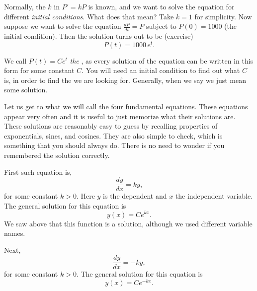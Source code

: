 \documentclass[12pt]{book}
\begin{document}
Normally, the $k$ in $P' = kP$ is known,
and we want to solve
the equation for different \emph{initial conditions}.
What does that mean?
Take $k=1$ for simplicity.  Now suppose we want to solve the equation
$\frac{dP}{dt} = P$ 
subject to $P(0) = 1000$ (the initial condition).
Then the solution turns out to be (exercise)
\begin{equation*}
P(t) = 1000 \, e^t .
\end{equation*}

We call $P(t) = C e^t$ \emph{the },
as every solution
of the equation can be written in this form for some constant $C$.  You
will need an initial condition to find out what $C$ is, in order to find the
\emph{} we are looking for.  Generally, when we say
 we just mean some solution.

\medskip

Let us get to what we will call the four fundamental equations.
These equations appear very often and it is useful to just memorize what
their solutions are.
These solutions
are reasonably easy
to guess by recalling properties of exponentials, sines, and cosines.
They are also simple to check, which is something that you should always do.
There is no need to wonder if you remembered the solution correctly.

\medskip

First such equation is,
\begin{equation*}
\frac{dy}{dx} = k y ,
\end{equation*}
for some constant $k > 0$.
Here $y$ is the dependent and $x$ the independent variable.
The general solution for this equation is
\begin{equation*}
y(x) = C e^{kx} .
\end{equation*}
We saw above that this function is a solution, although we used different
variable names.

\medskip

Next,
\begin{equation*}
\frac{dy}{dx} = -k y ,
\end{equation*}
for some constant $k > 0$.
The general solution for this equation is
\begin{equation*}
y(x) = C e^{-kx} .
\end{equation*}
\end{document}

